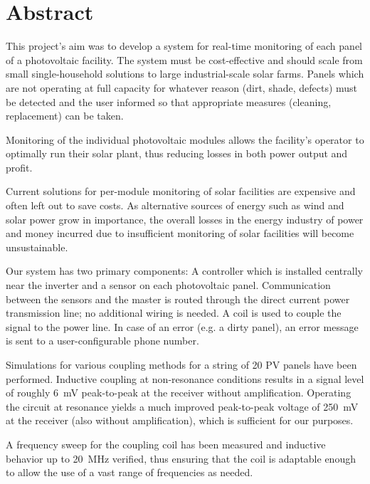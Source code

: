 \chapter*{Abstract}
\label{chap:abstract}
\enlargethispage{2em}

This project's  aim was to develop  a system for real-time  monitoring of each
panel  of a  photovoltaic facility.   The  system must  be cost-effective  and
should scale  from small single-household solutions  to large industrial-scale
solar  farms. Panels which  are not  operating at  full capacity  for whatever
reason (dirt, shade,  defects) must be detected and the  user informed so that
appropriate measures (cleaning, replacement) can be taken.

Monitoring  of  the  individual  photovoltaic modules  allows  the  facility's
operator to  optimally run  their solar  plant, thus  reducing losses  in both
power output and profit.

Current solutions for per-module monitoring  of solar facilities are expensive
and often left  out to save costs.   As alternative sources of  energy such as
wind and  solar power  grow in  importance, the overall  losses in  the energy
industry of power  and money incurred due to insufficient  monitoring of solar
facilities will become unsustainable.

Our  system  has  two  primary components: A  controller  which  is  installed
centrally  near  the  inverter  and  a  sensor  on  each  photovoltaic  panel.
Communication between the sensors and the  master is routed through the direct
current power  transmission line;  no additional wiring  is needed. A  coil is
used to couple the signal to the power line. In case of an error (e.g. a dirty
panel), an error message is sent to a user-configurable phone number.

Simulations for  various coupling methods  for a string  of 20 PV  panels have
been performed. Inductive  coupling at  non-resonance conditions results  in a
signal  level  of roughly  \SI{6}{\milli\volt}  peak-to-peak  at the  receiver
without  amplification. Operating  the  circuit  at resonance  yields  a  much
improved peak-to-peak  voltage of \SI{250}{\milli\volt} at  the receiver (also
without amplification), which is sufficient for our purposes.

A  frequency sweep  for  the coupling  coil has  been  measured and  inductive
behavior up to  \SI{20}{\mega\hertz} verified, thus ensuring that  the coil is
adaptable enough to allow the use of a vast range of frequencies as needed.

